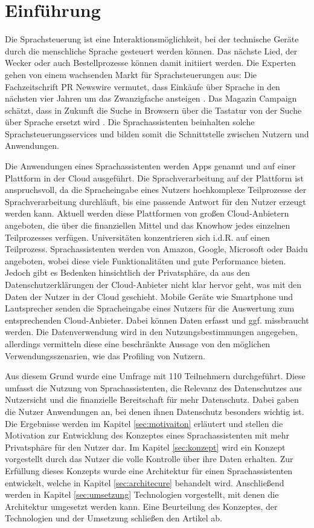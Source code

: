 \section{Einführung}
Die Sprachsteuerung ist eine Interaktionsmöglichkeit, bei der technische Geräte durch die menschliche Sprache gesteuert werden können. Das nächste Lied, der Wecker oder auch Bestellprozesse können damit initiiert werden.  Die Experten gehen von einem wachsenden Markt für Sprachsteuerungen aus: Die Fachzeitschrift \glqq PR Newswire\grqq{} vermutet, dass Einkäufe über Sprache in den nächsten vier Jahren um das Zwanzigfache ansteigen \cite{prNewswire}. Das Magazin \glqq Campaign\grqq{} schätzt, dass in Zukunft die Suche in Browsern über die Tastatur von der Suche über Sprache ersetzt wird \cite{Campaign}. Die Sprachassistenten beinhalten solche Sprachsteuerungsservices und bilden somit die Schnittstelle zwischen Nutzern und Anwendungen. 

Die Anwendungen eines Sprachassistenten werden Apps genannt und auf einer Plattform in der Cloud ausgeführt. Die Sprachverarbeitung auf der Plattform ist anspruchsvoll, da die Spracheingabe eines Nutzers hochkomplexe Teilprozesse der Sprachverarbeitung durchläuft, bis eine passende Antwort für den Nutzer erzeugt werden kann. Aktuell werden diese Plattformen von großen Cloud-Anbietern angeboten, die über die finanziellen Mittel und das Knowhow jedes einzelnen Teilprozesses verfügen. Universitäten konzentrieren sich i.d.R. auf einen Teilprozess. Sprachassistenten werden von Amazon, Google, Microsoft oder Baidu angeboten, wobei diese viele Funktionalitäten und gute Performance bieten. Jedoch gibt es Bedenken hinsichtlich der Privatsphäre, da aus den Datenschutzerklärungen der Cloud-Anbieter nicht klar hervor geht, was mit den Daten der Nutzer in der Cloud geschieht. Mobile Geräte wie Smartphone und Lautsprecher senden die Spracheingabe eines Nutzers für die Auswertung zum entsprechenden Cloud-Anbieter. Dabei können Daten erfasst und ggf. missbraucht werden. Die Datenverwendung wird in den Nutzungsbestimmungen angegeben, allerdings vermitteln diese eine beschränkte Aussage von den möglichen Verwendungsszenarien, wie das Profiling von Nutzern. 

Aus diesem Grund wurde eine Umfrage mit 110 Teilnehmern durchgeführt. Diese umfasst die Nutzung von Sprachassistenten, die Relevanz des Datenschutzes aus Nutzersicht und  die finanzielle Bereitschaft für mehr Datenschutz. Dabei gaben die Nutzer Anwendungen an, bei denen ihnen Datenschutz besonders wichtig ist. Die Ergebnisse werden im Kapitel \ref{sec:motivaiton} erläutert und stellen die Motivation zur Entwicklung des Konzeptes eines Sprachassistenten mit mehr Privatsphäre für den Nutzer dar. Im Kapitel \ref{sec:konzept} wird ein Konzept vorgestellt durch das Nutzer die volle Kontrolle über ihre Daten erhalten. Zur Erfüllung dieses Konzepts wurde eine Architektur für einen Sprachassistenten entwickelt, welche in Kapitel \ref{sec:architecure} behandelt wird. Anschließend werden in Kapitel \ref{sec:umsetzung} Technologien vorgestellt, mit denen die Architektur umgesetzt werden kann. Eine Beurteilung des Konzeptes, der Technologien und der Umsetzung schließen den Artikel ab. \newline


